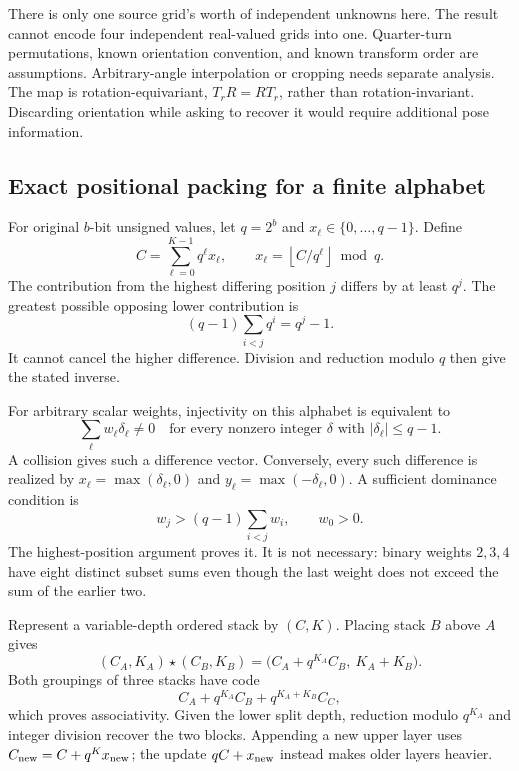 There is only one source grid's worth of independent unknowns here.
The result cannot encode four independent real-valued grids into one.
Quarter-turn permutations, known orientation convention, and known transform
order are assumptions. Arbitrary-angle interpolation or cropping needs
separate analysis. The map is rotation-equivariant, \(T_rR=RT_r\), rather
than rotation-invariant. Discarding orientation while asking to recover it
would require additional pose information.

\subsection{Exact positional packing for a finite alphabet}

For original \(b\)-bit unsigned values, let \(q=2^b\) and
\(x_\ell\in\{0,\ldots,q-1\}\). Define
\begin{equation}
 C=\sum_{\ell=0}^{K-1}q^\ell x_\ell,\qquad
 x_\ell=\left\lfloor C/q^\ell\right\rfloor\bmod q.
 \label{eq:radix}
\end{equation}
The contribution from the highest differing position \(j\) differs by
at least \(q^j\). The greatest possible opposing lower contribution is
\[
 (q-1)\sum_{i<j}q^i=q^j-1.
\]
It cannot cancel the higher difference. Division and reduction modulo \(q\)
then give the stated inverse.

For arbitrary scalar weights, injectivity on this alphabet is equivalent to
\[
 \sum_\ell w_\ell\delta_\ell\ne0
 \quad\text{for every nonzero integer }\delta
 \text{ with }|\delta_\ell|\le q-1.
\]
A collision gives such a difference vector. Conversely, every such difference
is realized by \(x_\ell=\max(\delta_\ell,0)\) and
\(y_\ell=\max(-\delta_\ell,0)\).
A sufficient dominance condition is
\[
 w_j>(q-1)\sum_{i<j}w_i,\qquad w_0>0.
\]
The highest-position argument proves it. It is not necessary: binary
weights \(2,3,4\) have eight distinct subset sums even though the last
weight does not exceed the sum of the earlier two.

Represent a variable-depth ordered stack by \((C,K)\). Placing stack \(B\)
above \(A\) gives
\[
 (C_A,K_A)\star(C_B,K_B)
 =\bigl(C_A+q^{K_A}C_B,\ K_A+K_B\bigr).
\]
Both groupings of three stacks have code
\[
 C_A+q^{K_A}C_B+q^{K_A+K_B}C_C,
\]
which proves associativity. Given the lower split depth, reduction modulo
\(q^{K_A}\) and integer division recover the two blocks.
Appending a new upper layer uses \(C_{\rm new}=C+q^Kx_{\rm new}\);
the update \(qC+x_{\rm new}\) instead makes older layers heavier.


